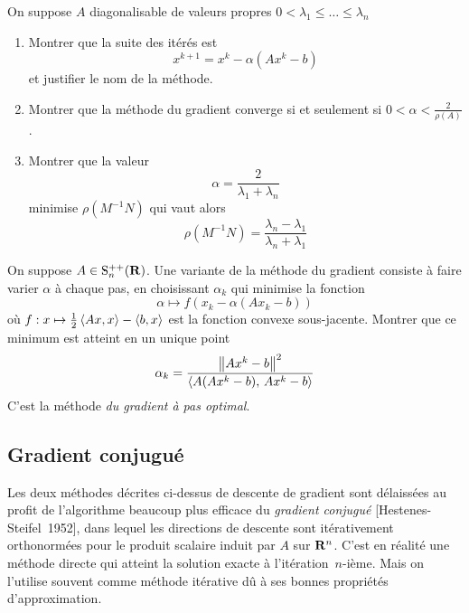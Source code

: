 \begin{exercice}
On suppose $A$ diagonalisable de valeurs propres $0 < \lambda_1 \leq \dots \leq \lambda_n$
\begin{enumerate}
\item Montrer que la suite des itérés est
\begin{displaymath}
x^{k+1} = x^{k} - \alpha (Ax^k -b)
\end{displaymath}
et justifier le nom de la méthode.
\item Montrer que la méthode du gradient converge si et seulement si $\displaystyle 0 < \alpha < \frac{2}{\rho(A)}$.
\item Montrer que la valeur
\begin{displaymath}
\alpha = \frac{2}{\lambda_1 + \lambda_n}
\end{displaymath}
minimise $\rho(M^{-1}N)$ qui vaut alors
\begin{displaymath}
\rho(M^{-1}N) = \frac{\lambda_n - \lambda_1}{\lambda_n + \lambda_1}
\end{displaymath}
\end{enumerate}
\end{exercice}

\begin{exercice}
On suppose $A \in \mathrm{S}^{++}_n(\mathbf{R})$. Une variante de la méthode du gradient
consiste à faire varier $\alpha$ à chaque pas, en choisissant $\alpha_k$
qui minimise la fonction
\begin{displaymath}
\alpha \mapsto f(x_k - \alpha(Ax_k -b))
\end{displaymath}
où $f: x \mapsto \frac{1}{2}\left\langle Ax,x\right\rangle - \left\langle b,x\right\rangle$ est la fonction
convexe sous-jacente. Montrer que ce minimum est atteint en un unique point
\begin{displaymath}
	\alpha_k = \frac{\left\|A x^k - b\right\|^2}{\left\langle A(Ax^k-b),\,Ax^k-b\right\rangle}
\end{displaymath}
C'est la méthode \emph{du gradient à pas optimal}.
\end{exercice}


\subsection{Gradient conjugué}
Les deux méthodes décrites ci-dessus de descente de gradient sont délaissées
au profit de l'algorithme beaucoup plus efficace du \emph{gradient conjugué}
[Hestenes-Steifel~1952], dans lequel les directions de descente sont
itérativement orthonormées pour le produit scalaire induit par $A$ sur
$\mathbf{R}^{n}$.
C'est en réalité une méthode directe qui atteint la solution exacte à
l'itération~$n$-ième.  Mais on l'utilise souvent comme méthode itérative dû à
ses bonnes propriétés d'approximation.

